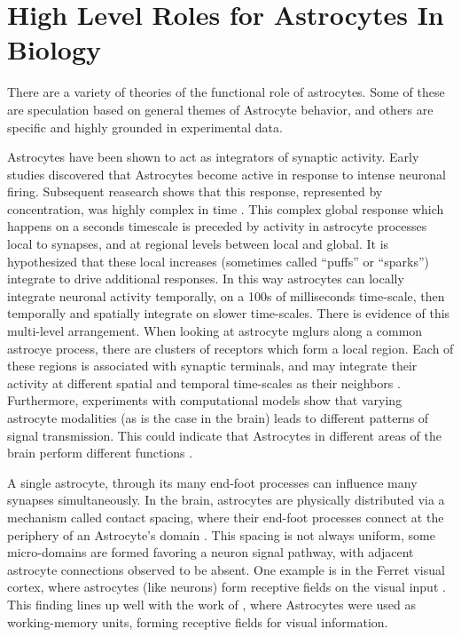 
    \section{High Level Roles for Astrocytes In Biology}

    There are a variety of theories of the functional role of astrocytes.
    Some of these are speculation based on general themes of Astrocyte behavior,
    and others are specific and highly grounded in experimental data.

    Astrocytes have been shown to act as integrators of synaptic activity. Early
    studies discovered that Astrocytes become active in response to intense
    neuronal firing. Subsequent reasearch shows that this response, represented
    by \ca concentration, was highly complex in time
    \parencite{araque_2014}. This complex global response which happens on a
    seconds timescale is preceded by \ca activity in astrocyte processes local
    to synapses, and at regional levels between local and global. It is
    hypothesized that these local \ca increases (sometimes called ``puffs'' or
    ``sparks'') integrate to drive additional responses. In this way astrocytes
    can locally integrate neuronal activity temporally, on a 100s of
    milliseconds time-scale, then temporally and spatially integrate on slower
    time-scales. There is evidence of this multi-level arrangement. When looking
    at astrocyte \Glspl{mglur} along a common astrocye process, there are
    clusters of receptors which form a local region. Each of these regions is
    associated with synaptic terminals, and may integrate their activity at
    different spatial and temporal time-scales as their neighbors
    \parencite{pitta_2012}. Furthermore, experiments with computational models
    show that varying astrocyte modalities (as is the case in the brain) leads
    to different patterns of signal transmission. This could indicate that
    Astrocytes in different areas of the brain perform different functions
    \parencite{pitta_2012}.

    A single astrocyte, through its many end-foot processes can influence many
    synapses simultaneously. In the brain, astrocytes are physically distributed
    via a mechanism called contact spacing, where their end-foot processes
    connect at the periphery of an Astrocyte's domain \parencite{pitta_2012}. This
    spacing is not always uniform, some micro-domains are formed favoring a
    neuron signal pathway, with adjacent astrocyte connections observed to be
    absent. One example is in the Ferret visual cortex, where astrocytes (like
    neurons) form receptive fields on the visual input \parencite{pitta_2012}. This
    finding lines up well with the work of \parencite{gordleeva_2021}, where
    Astrocytes were used as working-memory units, forming receptive fields for
    visual information.

